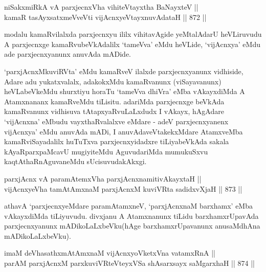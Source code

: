 
\begin{shl}
niSakxmiRkA vA parxjecnxVha vihiteVtayxtha BaNayxteV || \\
kamaR tasAyxsatxmeVveVti vijAcnxyeVtayxnuvAdataH \hfill || 872 ||  
\end{shl}

\begin{artha}
modalu kamaRvilalxda parxjecnxyu ililx vihitavAgide yeMtalAdarU heVLiruvudu A parxjecnxge kamaRvubeVkAdalilx `tameVva' eMdu heVLide, `vijAcnxya' eMdu ade parxjecnxyanunx anuvAda mADide.
\end{artha}


\begin{artha}
`parxjAcnxMkuviRVta' eMdu kamaRveV ilalxde parxjecnxyanunx vidhiside, Adare adu yukatxvalalx, adakokxMdu kamaRvanunx (viSayavanunx) heVLabeVkeMdu shurxtiyu horaTu `tameVva dhiVra' eMba vAkayxdiMda A Atamxnananx kamaRveMdu tiLisitu. adariMda parxjecnxge beVkAda kamaRvanunx vidhisuva tAtapxyaRvuLaLxdudx I vAkayx, hAgAdare `vijAcnxna' eMbudu vayxthaRvalalxve eMdare - adeV parxjecnxyanenx vijAcnxya' eMdu anuvAda mADi, I anuvAdaveVtakekxMdare AtamxveMba kamaRviSayadalilx huTuTxva parxjecnxyidadxre tiLiyabeVkAda sakala kAyaRparxpaMcavU mugiyiteMdu AguvudariMda mumukuSxvu kaqtAthaRnAguvaneMdu sUcisuvudakAkxgi.
\end{artha}


\begin{shl}
parxjAcnx vA paramAtemxVha parxjAcnxnamitivAkayxtaH ||  \\
vijAcnxyeVha tamAtAmxnaM parxjAcnxM kuviVRta sadidxvXjaH \hfill || 873 ||  
\end{shl}

\begin{artha}
athavA `parxjecnxyeMdare paramAtamxneV, `parxjAcnxnaM barxhamx' eMba vAkayxdiMda tiLiyuvudu. divxjanu A Atamxnanunx tiLidu barxhamxrUpavAda parxjecnxyanunx mADikoLaLxbeVku(hAge barxhamxrUpavanunx anusaMdhAna mADikoLaLxbeVku).
\end{artha}


\begin{shl}
imaM deVhasathxmAtAmxnaM vijAcnxyoVketxVna vatamxRnA || \\
parAM parxjAcnxM parxkuviVRteVteyxVSa shAsarxsayx saMgarxhaH \hfill || 874 ||  
\end{shl}

